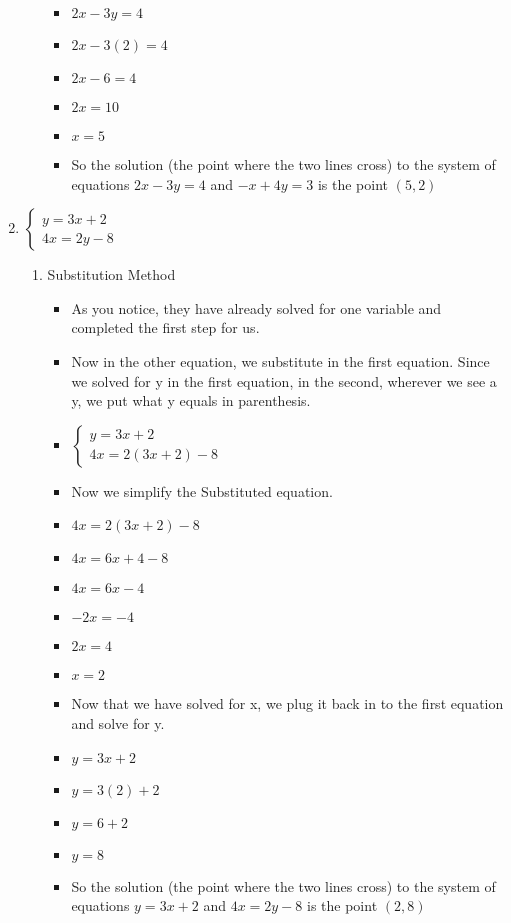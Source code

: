 \documentclass{article}
\begin{document}
\begin{enumerate}
\begin{enumerate}
\begin{itemize}
    \item [] $2x-3y=4$
    \item [] $2x-3(2)=4$
    \item [] $2x-6=4$
    \item [] $2x=10$
    \item [] $x=5$
    \item So the solution (the point where the two lines cross) to the system of equations $2x-3y=4$ and $-x+4y=3$ is the point $(5,2)$
    \end{itemize}
  \end{enumerate}
\item $\left\{ \begin{array}{l}
      y=3x+2 \\
      4x=2y-8 \end{array} \right.$
  \begin{enumerate}
  \item Substitution Method
    \begin{itemize}
    \item As you notice, they have already solved for one variable and completed the first step for us.
    \item Now in the other equation, we substitute in the first equation. Since we solved for y in the first equation, in the second, wherever we see a y, we put what y equals in parenthesis.
    \item []  $\left\{ \begin{array}{l}
              y=3x+2 \\
              4x=2(3x+2)-8 \end{array} \right.$
    \item Now we simplify the Substituted equation.
    \item []  $4x=2(3x+2)-8$
    \item []  $4x=6x+4-8$
    \item []  $4x=6x-4$
    \item []  $-2x=-4$
    \item []  $2x=4$
    \item []  $x=2$
    \item Now that we have solved for x, we plug it back in to the first equation and solve for y.
    \item []  $y=3x+2$
    \item []  $y=3(2)+2$
    \item []  $y=6+2$
    \item []  $y=8$
    \item So the solution (the point where the two lines cross) to the system of equations $y=3x+2$ and $4x=2y-8$ is the point $(2,8)$

\end{itemize}
\end{enumerate}
\end{enumerate}
\end{document}
